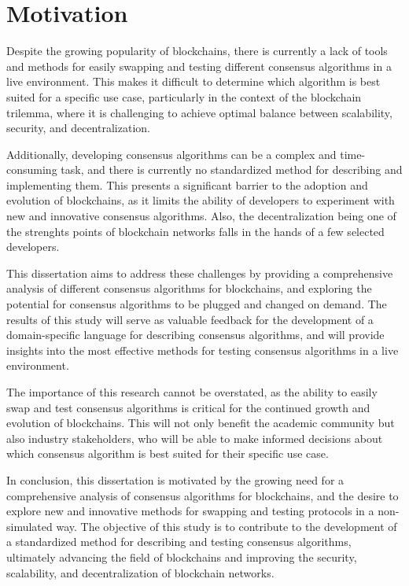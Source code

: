 \section*{Motivation}

Despite the growing popularity of blockchains, there is currently a lack of tools and methods for easily swapping and testing different consensus algorithms in a live environment.
This makes it difficult to determine which algorithm is best suited for a specific use case, particularly in the context of the blockchain trilemma, where it is challenging to achieve optimal balance between scalability, security, and decentralization.

Additionally, developing consensus algorithms can be a complex and time-consuming task, and there is currently no standardized method for describing and implementing them.
This presents a significant barrier to the adoption and evolution of blockchains, as it limits the ability of developers to experiment with new and innovative consensus algorithms. 
Also, the decentralization being one of the strenghts points of blockchain networks falls in the hands of a few selected developers.

This dissertation aims to address these challenges by providing a comprehensive analysis of different consensus algorithms for blockchains, and exploring the potential for consensus algorithms to be plugged and changed on demand.
The results of this study will serve as valuable feedback for the development of a domain-specific language for describing consensus algorithms, and will provide insights into the most effective methods for testing consensus algorithms in a live environment.

The importance of this research cannot be overstated, as the ability to easily swap and test consensus algorithms is critical for the continued growth and evolution of blockchains.
This will not only benefit the academic community but also industry stakeholders, who will be able to make informed decisions about which consensus algorithm is best suited for their specific use case.

In conclusion, this dissertation is motivated by the growing need for a comprehensive analysis of consensus algorithms for blockchains, and the desire to explore new and innovative methods for swapping and testing protocols in a non-simulated way.
The objective of this study is to contribute to the development of a standardized method for describing and testing consensus algorithms, ultimately advancing the field of blockchains and improving the security, scalability, and decentralization of blockchain networks.

